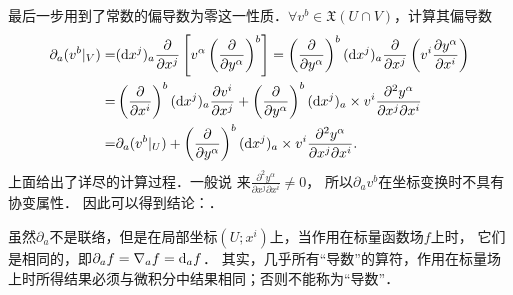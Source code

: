 最后一步用到了常数的偏导数为零这一性质．$\forall v^b \in \mathfrak{X}(U\cap V)$，计算其偏导数
    \begin{align*}
        \partial_a (v^b|_V ) =&    ({\rm d }x^j)_a\frac{\partial }{\partial x^j} \left[v^\alpha
        \left(\frac{\partial }{\partial y^\alpha}\right) ^b \right]
        = \left(\frac{\partial }{\partial y^\alpha}\right) ^b ({\rm d }x^j)_a
          \frac{\partial }{\partial x^j}\left(v^i \frac{\partial y^\alpha}{\partial x^i}\right) \\
        =& \left(\frac{\partial }{\partial x^i}\right) ^b ({\rm d }x^j)_a
        \frac{\partial v^i}{\partial x^j}
        +\left(\frac{\partial }{\partial y^\alpha}\right) ^b ({\rm d }x^j)_a
        \times v^i \frac{\partial^2 y^\alpha}{\partial x^j\partial x^i}   \\
        =& \partial_a (v^b|_U ) +\left(\frac{\partial }{\partial y^\alpha}\right) ^b ({\rm d }x^j)_a
        \times v^i \frac{\partial^2 y^\alpha}{\partial x^j\partial x^i}   .
    \end{align*}
上面给出了详尽的计算过程．一般说
来$\frac{\partial^2 y^\alpha}{\partial x^j\partial x^i}\neq 0$，
所以$\partial_a v^b$在坐标变换时不具有协变属性．
因此可以得到结论：．

虽然$\partial_a$不是联络，但是在局部坐标$(U;x^i)$上，当作用在标量函数场$f$上时，
它们是相同的，即$\partial_a f = \nabla_a f = {\rm d}_a f$．
其实，几乎所有“导数”的算符，作用在标量场上时所得结果必须与微积分中结果相同；否则不能称为“导数”．


